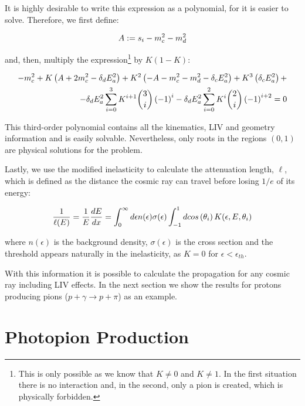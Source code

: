 \documentclass[a4paper]{jpconf}
\begin{document}
It is highly desirable to write this expression as a polynomial, for it is easier to solve. Therefore, we first define:

\begin{equation}
\centering
A := s_{i} - m_{c}^{2} - m_{d}^{2}
\end{equation}

and, then, multiply the expression\footnote{This is only possible as we know that $K \neq 0$ and $K \neq 1$. In the first situation there is no interaction and, in the second, only a pion is created, which is physically forbidden.} by $K(1-K)$:

\begin{equation}
\centering
\begin{split}
-m_{c}^{2} + K \left(A+2m_{c}^{2} - \delta_{d} E_{a}^{2}\right) + K^{2} \left(-A-m_{c}^{2}-m_{d}^{2} - \delta_{c} E_{a}^{2}\right) + K^{3} \left(\delta_{c} E_{a}^{2} \right) + \\
- \delta_{d} E_{a}^{2} \sum_{i=0}^{3} K^{i+1}  \binom{3}{i} \left(-1\right)^{i} - \delta_{d} E_{a}^{2} \sum_{i=0}^{2} K^{i} \binom{2}{i} \left(-1\right)^{i+2} = 0
\end{split}
\end{equation}

This third-order polynomial contains all the kinematics, LIV and geometry information and is easily solvable. Nevertheless, only roots in the regions $(0,1)$ are physical solutions for the problem.

Lastly, we use the modified inelasticity to calculate the attenuation length, $\ell$, which is defined as the distance the cosmic ray can travel before losing $1/e$ of its energy:

\begin{equation}
\centering
\frac{1}{\ell (E)} = \frac{1}{E} \frac{dE}{dx} = \int_{0}^{\infty} d\epsilon n(\epsilon) \sigma(\epsilon) \int_{-1}^{1} dcos \left(\theta_{i}\right) K(\epsilon,E,\theta_{i})
\end{equation}

where $n(\epsilon)$ is the background density, $\sigma(\epsilon)$ is the cross section and the threshold appears naturally in the inelasticity, as $K = 0$ for $\epsilon < \epsilon_{th}$.

With this information it is possible to calculate the propagation for any cosmic ray including LIV effects. In the next section we show the results for protons producing pions ($p + \gamma \rightarrow p + \pi$) as an example.

\section{Photopion Production}
\end{document}
